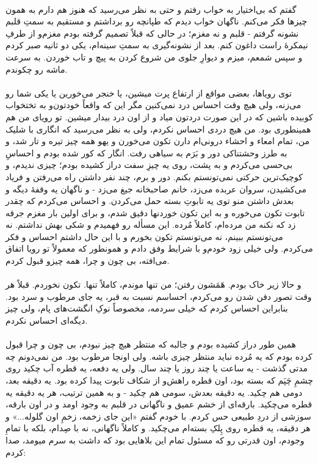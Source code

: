 \documentclass[12pt]{book}
\begin{document}
    \paragraph{}
    گفتم که بی‌اختیار به خواب رفتم و حتی به نظر می‌رسید که هنوز هم دارم به همون چیزها فکر می‌کنم. ناگهان خواب دیدم که طپانچه رو برداشتم و مستقیم به سمتِ قلبم نشونه گرفتم - قلبم و نه مغزم؛ در حالی که قبلاً تصمیم گرفته بودم مغزم‌و از طرفِ نیمکرهٔ راست داغون کنم. بعد از نشونه‌گیری به سمتِ سینه‌ام، یکی دو ثانیه صبر کردم و سپس شمعم، میزم و دیوارِ جلوی من شروع کردن به پیچ و تاب خوردن. به سرعت ماشه رو چکوندم.

    \paragraph{}
    توی رویاها، بعضی مواقع از ارتفاع پرت میشین، یا خنجر می‌خورین یا یکی شما رو می‌زنه، ولی هیچ وقت احساس درد نمی‌کنین مگر این که واقعاً خودتون‌و به تختخواب کوبیده باشین که در این صورت دردتون میاد و از اون درد بیدار میشین. تو رویای من هم همینطوری بود. من هیچ دردی احساس نکردم، ولی به نظر می‌رسید که انگاری با شلیک من، تمام امعاء و احشاء درونی‌ام دارن تکون می‌خورن و یهو همه چیز تیره و تار شد، و به طرز وحشتناکی دور و بَرَم به سیاهی رفت. انگار که کور شده بودم و احساسِ بی‌حسی می‌کردم و به پشت، روی یه چیزِ سفت دراز کشیده بودم؛ چیزی ندیدم، و کوچیک‌ترین حرکتی نمی‌تونستم بکنم. دور و برم، چند نفر داشتن راه می‌رفتن و فریاد می‌کشیدن، سروان عربده می‌زد، خانم صاحبخانه جیغ می‌زد - و ناگهان یه وقفهٔ دیگه و بعدش داشتن منو توی یه تابوتِ بسته حمل می‌کردن. و احساس می‌کردم که چقدر تابوت تکون می‌خوره و به این تکون خوردنها دقیق شدم، و برای اولین بار مغزم جرقه زد که نکنه من مرده‌ام، کاملاً مُرده. این مسأله رو فهمیدم و شکی بهش نداشتم. نه می‌تونستم ببینم، نه می‌تونستم تکون بخورم و با این حال داشتم احساس و فکر می‌کردم. ولی خیلی زود خودم‌و با شرایط وفق دادم و همونطور که معمولاً تو رویا اتفاق می‌افته، بی چون و چرا، همه چیزو قبول کردم.

    \paragraph{}
    و حالا زیر خاک بودم. هَمَشون رفتن؛ من تنها موندم، کاملاً تنها. تکون نخوردم. قبلاً هر وقت تصور دفن شدن رو می‌کردم، احساسم نسبت به قبر، یه جای مرطوب و سرد بود. بنابراین احساس کردم که خیلی سردمه، مخصوصاً نوکِ انگشت‌های پام، ولی چیز دیگه‌ای احساس نکردم.

    \paragraph{}
    همین طور دراز کشیده بودم و جالبه که منتظر هیچ چیز نبودم، بی چون و چرا قبول کرده بودم که یه مُرده نباید منتظر چیزی باشه. ولی اونجا مرطوب بود. من نمی‌دونم چه مدتی گذشت - یه ساعت یا چند روز یا چند سال. ولی یه دفعه، یه قطره آب چکید روی چشمِ چَپَم که بسته بود، اون قطره راهش‌و از شکاف تابوت پیدا کرده بود. یه دقیقه بعد، دومی هم چکید. یه دقیقه بعدش، سومی هم چکید - و به همین ترتیب، هر یه دقیقه یه قطره می‌چکید. بارقه‌ای از خشم عمیق و ناگهانی در قلبم به وجود اومد و در اون بارقه، سوزشی از دردِ طبیعی حس کردم. با خودم گفتم «این جای زخمه، زخمِ اون گلوله...» و هر دقیقه، یه قطره روی پِلکِ بسته‌ام می‌چکید. و کاملاً ناگهانی، نه با صِدام، بلکه با تمامِ وجودم، اون قدرتی رو که مسئول تمام این بلاهایی بود که داشت به سرم میومد، صدا کردم:
\end{document}

